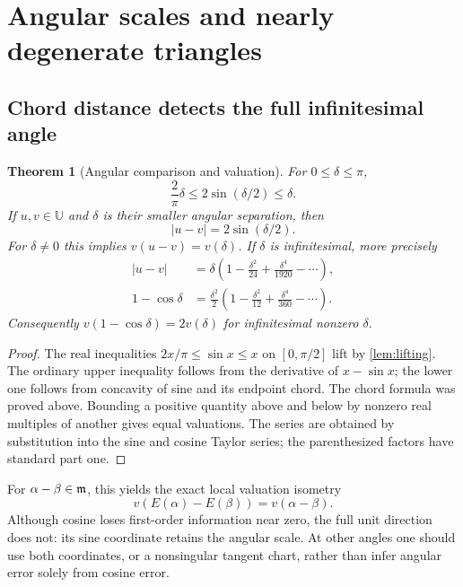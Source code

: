 \documentclass[11pt,letterpaper]{article}
\newtheorem{theorem}{Theorem}[section]
\theoremstyle{definition}
\theoremstyle{remark}
\newcommand{\U}{\mathbb U}\newcommand{\PP}{\mathbb P}
\numberwithin{equation}{section}
\begin{document}
\section{Angular scales and nearly degenerate triangles}\label{sec:scales}
\subsection{Chord distance detects the full infinitesimal angle}
\begin{theorem}[Angular comparison and valuation]\label{thm:angval}
For $0\le\delta\le\pi$,
\begin{equation}\label{eq:anglebounds}
 \frac2\pi\delta\le 2\sin(\delta/2)\le\delta.
\end{equation}
If $u,v\in\U$ and $\delta$ is their smaller angular separation, then
\[
 |u-v|=2\sin(\delta/2).
\]
For $\delta\ne0$ this implies $v(u-v)=v(\delta)$. If $\delta$ is infinitesimal, more precisely
\begin{align}
 |u-v|&=\delta\left(1-\frac{\delta^2}{24}
                         +\frac{\delta^4}{1920}-\cdots\right),\label{eq:chordseries}\\
 1-\cos\delta&=\frac{\delta^2}{2}
       \left(1-\frac{\delta^2}{12}+\frac{\delta^4}{360}-\cdots\right).
 \label{eq:cosdefect}
\end{align}
Consequently $v(1-\cos\delta)=2v(\delta)$ for infinitesimal nonzero $\delta$.
\end{theorem}
\begin{proof}
The real inequalities $2x/\pi\le\sin x\le x$ on $[0,\pi/2]$ lift by \cref{lem:lifting}. The ordinary upper inequality follows from the derivative of $x-\sin x$; the lower one follows from concavity of sine and its endpoint chord. The chord formula was proved above. Bounding a positive quantity above and below by nonzero real multiples of another gives equal valuations. The series are obtained by substitution into the sine and cosine Taylor series; the parenthesized factors have standard part one.
\end{proof}

For $\alpha-\beta\in\mathfrak m$, this yields the exact local valuation isometry
\begin{equation}\label{eq:localisometry}
 v(E(\alpha)-E(\beta))=v(\alpha-\beta).
\end{equation}
Although cosine loses first-order information near zero, the full unit direction does not: its sine coordinate retains the angular scale. At other angles one should use both coordinates, or a nonsingular tangent chart, rather than infer angular error solely from cosine error.
\end{document}
